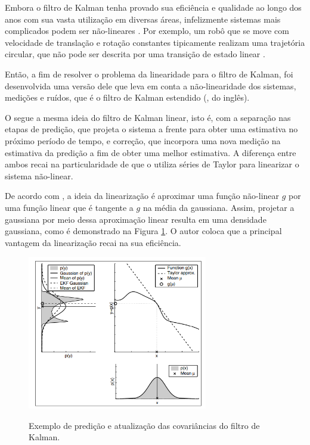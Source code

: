 \documentclass[acronym, symbols, table]{fei}
\begin{document}
			Embora o filtro de Kalman tenha provado sua eficiência e qualidade ao longo dos anos com sua vasta utilização em diversas áreas, infelizmente sistemas mais complicados podem ser não-lineares \cite{khodarahmi2023review}. Por exemplo, um robô que se move com velocidade de translação e rotação constantes tipicamente realizam uma trajetória circular, que não pode ser descrita por uma transição de estado linear \cite{thrun2002probabilistic}.
			
			Então, a fim de resolver o problema da linearidade para o filtro de Kalman, foi desenvolvida uma versão dele que leva em conta a não-linearidade dos sistemas, medições e ruídos, que é o filtro de Kalman estendido (, do inglês).
			
			O  segue a mesma ideia do filtro de Kalman linear, isto é, com a separação nas etapas de predição, que projeta o sistema a frente para obter uma estimativa no próximo período de tempo, e correção, que incorpora uma nova medição na estimativa da predição a fim de obter uma melhor estimativa. A diferença entre ambos recai na particularidade de que o  utiliza séries de Taylor para linearizar o sistema não-linear.
			
			De acordo com \textcite{thrun2002probabilistic}, a ideia da linearização é aproximar uma função não-linear $g$ por uma função linear que é tangente a $g$ na média da gaussiana. Assim, projetar a gaussiana por meio dessa aproximação linear resulta em uma densidade gaussiana, como é demonstrado na Figura \ref{fig:ekf_linearizacao}. O autor coloca que a principal vantagem da linearização recai na sua eficiência.
			
			\begin{figure}[!htb]
				\centering
				\caption{Exemplo de predição e atualização das covariâncias do filtro de Kalman.}
				\includegraphics[width=0.7\textwidth]{figura_linearizacao_ekf.png}
				\label{fig:ekf_linearizacao}
			\end{figure}
			
\end{document}
